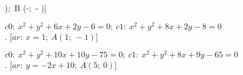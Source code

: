 \begin{esercizio}
\begin{enumeratea}
);~B \left (-;~- \right )\)]
  \item  \(c0:~x^2 + y^2 +6x +2y -6 = 0;~c1:~x^2 + y^2 +8x +2y -8 = 0\)\\
.
   \hfill [\(ar:~x = 1;~A \left (1;~-1 \right )\)]
  \item  \(c0:~x^2 + y^2 +10x +10y -75 = 0;~c1:~x^2 + y^2 +8x +9y -65 = 0\)\\
.
   \hfill [\(ar:~y = -2 x +10;~A \left (5;~0 \right )\)]

\end{enumeratea}
\end{esercizio}
